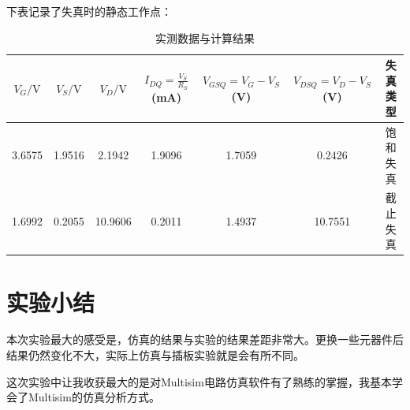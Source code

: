 \documentclass[a4paper,11pt,UTF8]{article}
\numberwithin{equation}{subsection}
\begin{document}
下表记录了失真时的静态工作点：

\begin{table}[h]
	\centering
	\caption{实测数据与计算结果}
	\begin{tabular}{|c|c|c|c|c|c|c|}
	\hline
	\( V_G/\mathrm{V} \) & \( V_S/\mathrm{V} \) & \( V_D/\mathrm{V} \) & \( I_{DQ} = \frac{V_S}{R_S} \) (mA) & \( V_{GSQ} = V_G - V_S \) (V) & \( V_{DSQ} = V_D - V_S \) (V) & 失真类型 \\
	\hline
	3.6575 & 1.9516 & 2.1942 & 1.9096 & 1.7059 & 0.2426 & 饱和失真 \\
	\hline
	1.6992 & 0.2055 & 10.9606 & 0.2011 & 1.4937 & 10.7551 & 截止失真 \\
	\hline
	\end{tabular}
\end{table}

\section{实验小结}

本次实验最大的感受是，仿真的结果与实验的结果差距非常大。更换一些元器件后结果仍然变化不大，实际上仿真与插板实验就是会有所不同。

这次实验中让我收获最大的是对Multisim电路仿真软件有了熟练的掌握，我基本学会了Multisim的仿真分析方式。
\end{document}
